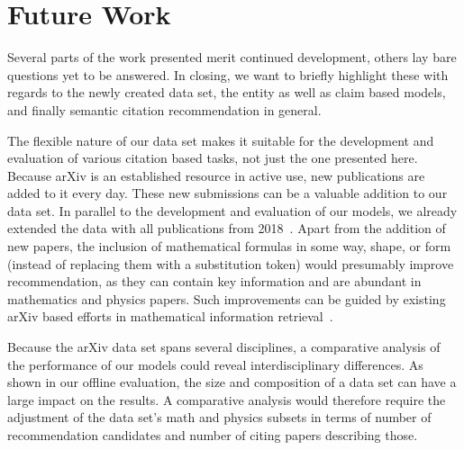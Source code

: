 \chapter{Future Work}\label{chap:todo}
Several parts of the work presented merit continued development, others lay bare questions yet to be answered. In closing, we want to briefly highlight these with regards to the newly created data set, the entity as well as claim based models, and finally semantic citation recommendation in general.

The flexible nature of our data set makes it suitable for the development and evaluation of various citation based tasks, not just the one presented here. Because arXiv is an established resource in active use, new publications are added to it every day. These new submissions can be a valuable addition to our data set. In parallel to the development and evaluation of our models, we already extended the data with all publications from 2018~\cite{Saier2019}. Apart from the addition of new papers, the inclusion of mathematical formulas in some way, shape, or form (instead of replacing them with a substitution token) would presumably improve recommendation, as they can contain key information and are abundant in mathematics and physics papers. Such improvements can be guided by existing arXiv based efforts in mathematical information retrieval~\cite{Aizawa2014,Zanibbi2016}.

Because the arXiv data set spans several disciplines, a comparative analysis of the performance of our models could reveal interdisciplinary differences. As shown in our offline evaluation, the size and composition of a data set can have a large impact on the results. A comparative analysis would therefore require the adjustment of the data set's math and physics subsets in terms of number of recommendation candidates and number of citing papers describing those.

